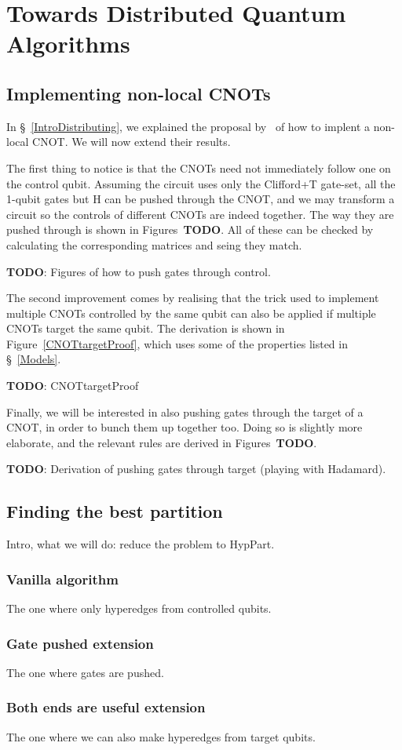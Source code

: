 \chapter{Towards Distributed Quantum Algorithms}
\label{chap:Project}

\section{Implementing non-local CNOTs}
\label{NonLocalGates}

In \S~\ref{IntroDistributing}, we explained the proposal by~\citet{NonLocalCNOT} of how to implent a non-local CNOT. We will now extend their results.

The first thing to notice is that the CNOTs need not immediately follow one on the control qubit. Assuming the circuit uses only the Clifford+T gate-set, all the 1-qubit gates but H can be pushed through the CNOT, and we may transform a circuit so the controls of different CNOTs are indeed together. The way they are pushed through is shown in Figures~\textbf{TODO}. All of these can be checked by calculating the corresponding matrices and seing they match.

\textbf{TODO}: Figures of how to push gates through control.

The second improvement comes by realising that the trick used to implement multiple CNOTs controlled by the same qubit can also be applied if multiple CNOTs target the same qubit. The derivation is shown in Figure~\ref{CNOTtargetProof}, which uses some of the properties listed in \S~\ref{Models}.

\textbf{TODO}: CNOTtargetProof

Finally, we will be interested in also pushing gates through the target of a CNOT, in order to bunch them up together too. Doing so is slightly more elaborate, and the relevant rules are derived in Figures~\textbf{TODO}.

\textbf{TODO}: Derivation of pushing gates through target (playing with Hadamard).

\section{Finding the best partition}

Intro, what we will do: reduce the problem to HypPart.

\subsection{Vanilla algorithm}

The one where only hyperedges from controlled qubits.

\subsection{Gate pushed extension}

The one where gates are pushed.

\subsection{Both ends are useful extension}

The one where we can also make hyperedges from target qubits.